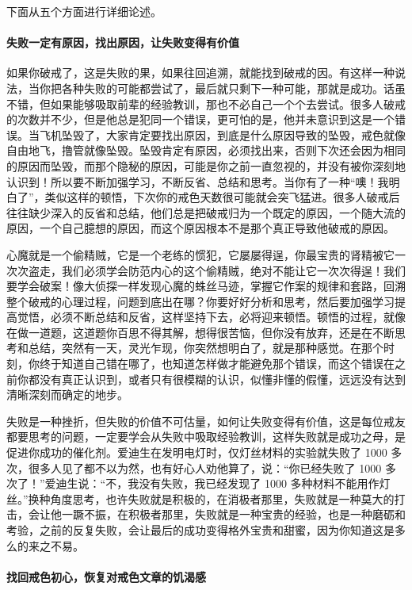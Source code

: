 下面从五个方面进行详细论述。

\paragraph{失败一定有原因，找出原因，让失败变得有价值}

如果你破戒了，这是失败的果，如果往回追溯，就能找到破戒的因。有这样一种说法，当你把各种失败的可能都尝试了，最后就只剩下一种可能，那就是成功。话虽不错，但如果能够吸取前辈的经验教训，那也不必自己一个个去尝试。很多人破戒的次数并不少，但是他总是犯同一个错误，更可怕的是，他并未意识到这是一个错误。当飞机坠毁了，大家肯定要找出原因，到底是什么原因导致的坠毁，戒色就像自由地飞，撸管就像坠毁。坠毁肯定有原因，必须找出来，否则下次还会因为相同的原因而坠毁，而那个隐秘的原因，可能是你之前一直忽视的，并没有被你深刻地认识到！所以要不断加强学习，不断反省、总结和思考。当你有了一种“噢！我明白了”，类似这样的顿悟，下次你的戒色天数很可能就会突飞猛进。很多人破戒后往往缺少深入的反省和总结，他们总是把破戒归为一个既定的原因，一个随大流的原因，一个自己臆想的原因，而这个原因根本不是那个真正导致他破戒的原因。

心魔就是一个偷精贼，它是一个老练的惯犯，它屡屡得逞，你最宝贵的肾精被它一次次盗走，我们必须学会防范内心的这个偷精贼，绝对不能让它一次次得逞！我们要学会破案！像大侦探一样发现心魔的蛛丝马迹，掌握它作案的规律和套路，回溯整个破戒的心理过程，问题到底出在哪？你要好好分析和思考，然后要加强学习提高觉悟，必须不断总结和反省，这样坚持下去，必将迎来顿悟。顿悟的过程，就像在做一道题，这道题你百思不得其解，想得很苦恼，但你没有放弃，还是在不断思考和总结，突然有一天，灵光乍现，你突然想明白了，就是那种感觉。在那个时刻，你终于知道自己错在哪了，也知道怎样做才能避免那个错误，而这个错误在之前你都没有真正认识到，或者只有很模糊的认识，似懂非懂的假懂，远远没有达到清晰深刻而确定的地步。

失败是一种挫折，但失败的价值不可估量，如何让失败变得有价值，这是每位戒友都要思考的问题，一定要学会从失败中吸取经验教训，这样失败就是成功之母，是促进你成功的催化剂。爱迪生在发明电灯时，仅灯丝材料的实验就失败了 1000 多次，很多人见了都不以为然，也有好心人劝他算了，说：“你已经失败了 1000 多次了！”爱迪生说：“不，我没有失败，我已经发现了 1000 多种材料不能用作灯丝。”换种角度思考，也许失败就是积极的，在消极者那里，失败就是一种莫大的打击，会让他一蹶不振，在积极者那里，失败就是一种宝贵的经验，也是一种磨砺和考验，之前的反复失败，会让最后的成功变得格外宝贵和甜蜜，因为你知道这是多么的来之不易。

\paragraph{找回戒色初心，恢复对戒色文章的饥渴感}

